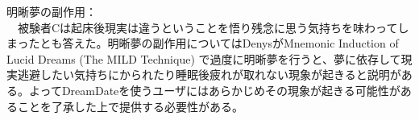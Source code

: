 明晰夢の副作用：\\
　被験者Cは起床後現実は違うということを悟り残念に思う気持ちを味わってしまったとも答えた。明晰夢の副作用についてはDenysがMnemonic Induction of Lucid Dreams (The MILD Technique) で過度に明晰夢を行うと、夢に依存して現実逃避したい気持ちにかられたり睡眠後疲れが取れない現象が起きると説明がある\cite{LaBerge}。よってDreamDateを使うユーザにはあらかじめその現象が起きる可能性があることを了承した上で提供する必要性がある。